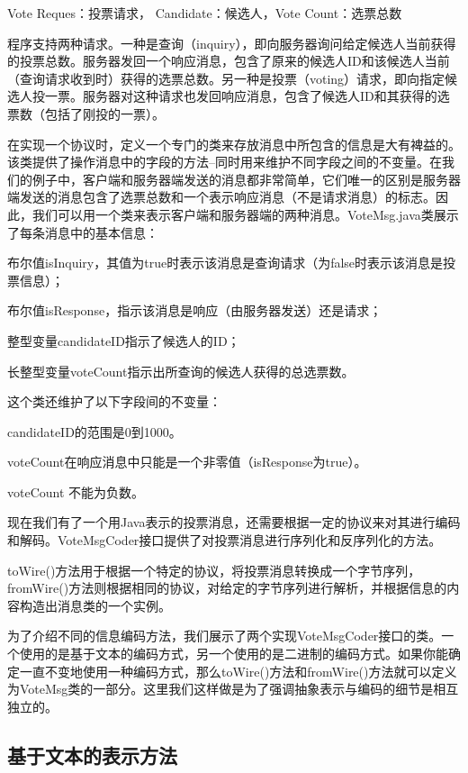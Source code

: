 	Vote Reques：投票请求， Candidate：候选人，Vote Count：选票总数 

	程序支持两种请求。一种是查询（inquiry），即向服务器询问给定候选人当前获得的投票总数。服务器发回一个响应消息，包含了原来的候选人ID和该候选人当前（查询请求收到时）获得的选票总数。另一种是投票（voting）请求，即向指定候选人投一票。服务器对这种请求也发回响应消息，包含了候选人ID和其获得的选票数（包括了刚投的一票）。 

	在实现一个协议时，定义一个专门的类来存放消息中所包含的信息是大有裨益的。该类提供了操作消息中的字段的方法--同时用来维护不同字段之间的不变量。在我们的例子中，客户端和服务器端发送的消息都非常简单，它们唯一的区别是服务器端发送的消息包含了选票总数和一个表示响应消息（不是请求消息）的标志。因此，我们可以用一个类来表示客户端和服务器端的两种消息。VoteMsg.java类展示了每条消息中的基本信息： 

	布尔值isInquiry，其值为true时表示该消息是查询请求（为false时表示该消息是投票信息）； 

	布尔值isResponse，指示该消息是响应（由服务器发送）还是请求；

	整型变量candidateID指示了候选人的ID； 

	长整型变量voteCount指示出所查询的候选人获得的总选票数。 

	这个类还维护了以下字段间的不变量： 

	candidateID的范围是0到1000。 

	voteCount在响应消息中只能是一个非零值（isResponse为true）。 

	voteCount 不能为负数。 

	

	现在我们有了一个用Java表示的投票消息，还需要根据一定的协议来对其进行编码和解码。VoteMsgCoder接口提供了对投票消息进行序列化和反序列化的方法。 

	

	toWire()方法用于根据一个特定的协议，将投票消息转换成一个字节序列，fromWire()方法则根据相同的协议，对给定的字节序列进行解析，并根据信息的内容构造出消息类的一个实例。 

	为了介绍不同的信息编码方法，我们展示了两个实现VoteMsgCoder接口的类。一个使用的是基于文本的编码方式，另一个使用的是二进制的编码方式。如果你能确定一直不变地使用一种编码方式，那么toWire()方法和fromWire()方法就可以定义为VoteMsg类的一部分。这里我们这样做是为了强调抽象表示与编码的细节是相互独立的。 


	\subsection{基于文本的表示方法}

